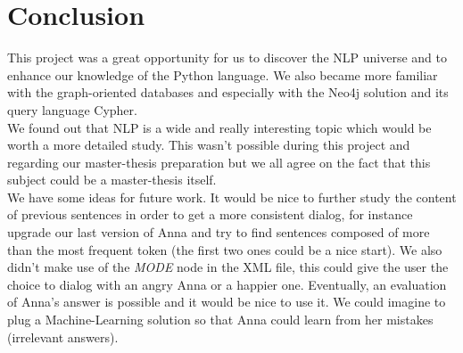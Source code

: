 \section{Conclusion}
This project was a great opportunity for us to discover the NLP universe and to enhance our knowledge of the Python language. We also became more familiar with the graph-oriented databases and especially with the Neo4j solution and its query language Cypher.\\

We found out that NLP is a wide and really interesting topic which would be worth a more detailed study. This wasn't possible during this project and regarding our master-thesis preparation but we all agree on the fact that this subject could be a master-thesis itself.\\

We have some ideas for future work. It would be nice to further study the content of previous sentences in order to get a more consistent dialog, for instance upgrade our last version of Anna and try to find sentences composed of more than the most frequent token (the first two ones could be a nice start). We also didn't make use of the \emph{MODE} node in the XML file, this could give the user the choice to dialog with an angry Anna or a happier one. Eventually, an evaluation of Anna's answer is possible and it would be nice to use it. We could imagine to plug a Machine-Learning solution so that Anna could learn from her mistakes (irrelevant answers).